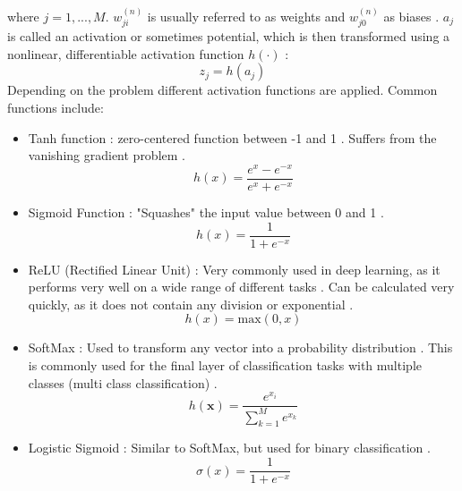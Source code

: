 \documentclass[draft,final,oneside]{vutinfth} %
\begin{document}
where $j = 1, ..., M$. $w_{ji}^{(n)}$ is usually referred to as weights and $w_{j0}^{(n)}$ as biases \cite{bishop}. $a_j$ is called an activation or sometimes potential, which is then transformed using a nonlinear, differentiable activation function $h(\cdot)$ \cite{bishop}:
\begin{equation}
z_j = h(a_j)
\end{equation}
Depending on the problem different activation functions are applied. Common functions include:
\begin{itemize}
\item Tanh function \cite{activationfunctions}: zero-centered function between -1 and 1 \cite{activationfunctions}. Suffers from the vanishing gradient problem \cite{activationfunctions}.
\begin{equation}
h(x) = \dfrac{e^x - e^{-x}}{e^x + e^{-x}}
\end{equation}
\item Sigmoid Function \cite{anintroductiontoneuralnetworks}: "Squashes" the input value between 0 and 1 \cite{anintroductiontoneuralnetworks}.
\begin{equation}
h(x) = \dfrac {1} {1 + e^{-x}}
\end{equation}
\item ReLU (Rectified Linear Unit) \cite{Goodfellow-et-al-2016}: Very commonly used in deep learning, as it performs very well on a wide range of different tasks \cite{activationfunctions}. Can be calculated very quickly, as it does not contain any division or exponential \cite{activationfunctions}.
\begin{equation}
h(x) = \text{max}(0, x)
\end{equation}
\item SoftMax \cite{Goodfellow-et-al-2016}: Used to transform any vector into a probability distribution \cite{activationfunctions}. This is commonly used for the final layer of classification tasks with multiple classes (multi class classification) \cite{activationfunctions}.
\begin{equation}
h(\boldsymbol{x}) = \dfrac{e^{x_i}}{\sum_{k=1}^{M} e^{x_k}}
\end{equation}
\item Logistic Sigmoid \cite{Goodfellow-et-al-2016}: Similar to SoftMax, but used for binary classification \cite{Goodfellow-et-al-2016}.
\begin{equation}
\sigma(x) = \dfrac{1}{1 + e^{-x}}
\end{equation}
\end{itemize}
\end{document}

